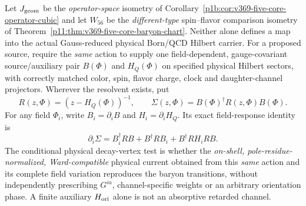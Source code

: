\documentclass[12pt,a4paper]{article}
\begin{document}
\begin{definition}
\label{p10:def:v369-five-core-baryon-decay-action-test}
Let $J_{\rm geom}$ be the \emph{operator-space} isometry of
Corollary~\ref{p1b:cor:v369-five-core-operator-cubic} and let
$W_{56}$ be the \emph{different-type} spin--flavor comparison isometry
of Theorem~\ref{p11:thm:v369-five-core-baryon-chart}.
Neither alone defines a map into the actual Gauss-reduced physical
Born/QCD Hilbert carrier.  For a proposed source, require the
\emph{same} action to supply one field-dependent, gauge-covariant
source/auxiliary pair $B(\Phi)$ and $H_Q(\Phi)$ on specified physical
Hilbert sectors, with correctly matched color, spin, flavor charge,
clock and daughter-channel projectors.  Wherever the resolvent exists,
put
\[
 R(z,\Phi)=(z-H_Q(\Phi))^{-1},\qquad
 \Sigma(z,\Phi)=B(\Phi)^\dagger R(z,\Phi)B(\Phi).
\]
For any field $\Phi_i$, write $B_i=\partial_iB$ and
$H_i=\partial_iH_Q$.  Its exact field-response identity is
\[
 \boxed{\partial_i\Sigma=B_i^\dagger RB+B^\dagger RB_i
 +B^\dagger RH_iRB.}
\]
The conditional physical decay-vertex test is whether the
\emph{on-shell, pole-residue-normalized, Ward-compatible} physical
current obtained from this \emph{same} action and its complete
field variation reproduces the baryon transitions, without
independently prescribing $G^{ia}$, channel-specific weights or an
arbitrary orientation phase.  A finite auxiliary $H_{\rm ori}$ alone
is not an absorptive retarded channel.
\end{definition}
\end{document}
